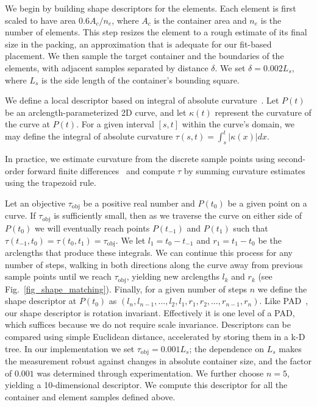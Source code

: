 
\newtext
{
We begin by building shape descriptors for the elements.  
Each element is first scaled to have area
$0.6A_c/n_e$, where $A_c$ is the container area and $n_e$ is the 
number of elements.  This step resizes the element to a rough estimate
of its final size in the packing, an approximation that is adequate
for our fit-based placement.  We then sample the target container and
the boundaries of the elements, with adjacent samples separated by
distance $\delta$.  We set $\delta=0.002L_s$, where $L_s$ is the
side length of the container's bounding square.
}

\newtext
{
We define a local descriptor based on integral of absolute curvature~\cite{Cui2009,Kwan2016}.
Let $P(t)$ be an arclength-parameterized 2D curve, and let $\kappa(t)$ represent the curvature of the curve at $P(t)$.  For a given interval $[s,t]$ within the curve's domain, we may define the integral of absolute curvature
$\tau(s,t) = \int_{s}^{t} | \kappa(x) | dx$.
}

In practice, we estimate curvature from the discrete sample points
using second-order forward finite differences~\cite{Banchoff} 
and compute $\tau$ by summing curvature estimates using the trapezoid rule.

Let an objective $\tau_\mathrm{obj}$ be a positive real number and $P(t_0)$ be a given point on a curve.  If $\tau_\mathrm{obj}$ is sufficiently small, then as we traverse the curve on either side of $P(t_0)$ we will eventually reach points $P(t_{-1})$ and $P(t_1)$ such that $\tau(t_{-1},t_0)=\tau(t_0,t_1)=\tau_\mathrm{obj}$.  We let $l_1=t_0-t_{-1}$ and $r_1=t_1-t_0$ be the arclengths that produce these integrals.  We can continue this process for any number of steps, walking in both directions along the curve away from previous sample points until we reach $\tau_\mathrm{obj}$, yielding new arclengths $l_k$ and $r_k$ (see Fig.~\ref{fig_shape_matching}).  Finally, for a given number of steps $n$ we define the shape descriptor at $P(t_0)$ as
$(l_n, l_{n-1}, \ldots, l_2, l_1, r_1, r_2, \ldots, r_{n-1}, r_n)$.
Like PAD~\cite{Kwan2016}, our shape descriptor is rotation 
invariant.  Effectively it is one level of a PAD, which suffices because
we do not require scale invariance.
Descriptors can be compared using simple Euclidean distance, accelerated
by storing them in a k-D tree.
In our implementation we set $\tau_\mathrm{obj}=0.001L_s$; the dependence
on $L_s$ makes the measurement robust against changes in absolute container
size, and the factor of $0.001$ was determined through experimentation.
We further choose $n=5$, yielding a 10-dimensional descriptor. We compute
this descriptor for all the container and element samples defined above.

